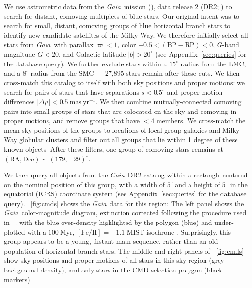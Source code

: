 \documentclass[twocolumn]{aastex62}
\newcommand{\acronym}[1]{{\small{#1}}}
\newcommand{\gaia}{\textsl{Gaia}}
\newcommand{\DR}[1]{\acronym{DR#1}}
\newcommand{\masyr}{\ensuremath{\textrm{mas}~\textrm{yr}^{-1}}}
\newcommand{\feh}{\ensuremath{[\textrm{Fe} / \textrm{H}]}}
\newcommand{\bprp}{\ensuremath{\textrm{BP} - \textrm{RP}}}
\newcommand{\changes}[1]{{\ \color{black}{\textbf{#1}\ }}}
\begin{document}
We use astrometric data from the \gaia\ mission (\citealt{Prusti:2016}), data release 2 (\DR{2}; \citealt{Gaia-Collaboration:2018, Lindegren:2018}) to search for distant, comoving multiplets of blue stars.
Our original intent was to search for small, distant, comoving groups of blue horizontal branch stars to identify new candidate satellites of the Milky Way.
We therefore initially select all stars from \gaia\ with parallax $\varpi < 1$, color $-0.5 < (\bprp) < 0$, $G$-band magnitude $G < 20$, and Galactic latitude $|b| > 20^\circ$ (see Appendix~\ref{sec:queries} for the database query).
We further exclude stars within a $15^\circ$ radius from the LMC, and a $8^\circ$ radius from the SMC --- 27,895 stars remain after these cuts.
We then cross-match this catalog to itself with both sky positions and proper motions: we search for pairs of stars that have separations $s < 0.5^\circ$ and proper motion differences $|\Delta \mu| < 0.5~\masyr$.
We then combine mutually-connected comoving pairs into small groups of stars that are colocated on the sky and comoving in proper motions, and remove groups that have $<4$ members.
We cross-match the mean sky positions of the groups to locations of local group galaxies \citep{McConnachie:2012} and Milky Way globular clusters \citep[2010 edition;][]{Harris:1996} and filter out all groups that lie within 1 degree of these known objects.
After these filters, one group of comoving stars remains at $(\textrm{RA}, \textrm{Dec}) \sim (179, -29)^\circ$.

We then query all objects from the \gaia\ \DR{2} catalog within a rectangle centered on the nominal position of this group, with a width of $5^\circ$ and a height of $5^\circ$ in the equatorial (ICRS) coordinate system (see Appendix~\ref{sec:queries} for the database query).
\figurename~\ref{fig:cmds} shows the \gaia\ data for this region:
The left panel shows the \gaia\ color-magnitude diagram, extinction corrected following the procedure used in \citet{Danielski:2018} \changes{and the coefficients from \citet{Babusiaux:2018}}, with the blue over-density highlighted by the polygon (blue) and under-plotted with a $100~\textrm{Myr}$, $\feh = -1.1$ \acronym{MIST} isochrone \citep[red line;][]{Dotter:2016, Choi:2016, Paxton:2011, Paxton:2013, Paxton:2015}.
Surprisingly, this group appears to be a young, distant main sequence, rather than an old population of horizontal branch stars.
The middle and right panels of \figurename~\ref{fig:cmds} show sky positions and proper motions of all stars in this sky region (grey background density), and only stars in the CMD selection polygon (black markers).
\end{document}
